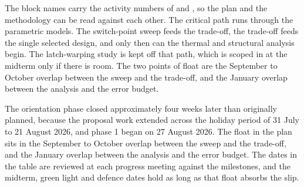 The block names carry the activity numbers of  and , so the plan and the methodology can be read against each other. The critical path runs through the parametric models. The switch-point sweep feeds the trade-off, the trade-off feeds the single selected design, and only then can the thermal and structural analysis begin. The latch-warping study is kept off that path, which is scoped in at the midterm only if there is room. The two points of float are the September to October overlap between the sweep and the trade-off, and the January overlap between the analysis and the error budget.

The orientation phase closed approximately four weeks later than originally planned, because the proposal work extended across the holiday period of 31 July to 21 August 2026, and phase 1 began on 27 August 2026. The float in the plan sits in the September to October overlap between the sweep and the trade-off, and the January overlap between the analysis and the error budget. The dates in the table are reviewed at each progress meeting against the milestones, and the midterm, green light and defence dates hold as long as that float absorbs the slip.